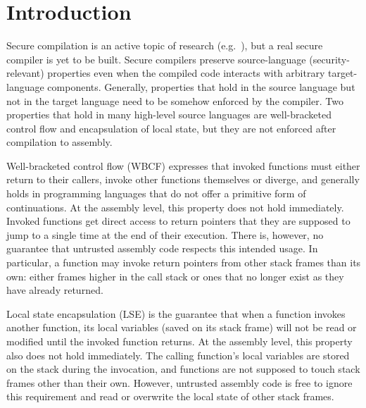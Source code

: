 \documentclass[acmsmall,screen]{acmart}\settopmatter{}
\begin{document}




\maketitle


\section{Introduction}
\label{sec:introduction}
Secure compilation is an active topic of research (e.g.~\citep{devriese_modular_2017,patrignani_hyper_2017,Abate:2018:GCG:3243734.3243745,new_universal_embedding_2016,juglaret_beyond_2016}), but a real secure compiler is yet to be built.
Secure compilers preserve source-language (security-relevant) properties even when the compiled code interacts with arbitrary target-language components.
Generally, properties that hold in the source language but not in the target language need to be somehow enforced by the compiler.
Two properties that hold in many high-level source languages are well-bracketed control flow and encapsulation of local state, but they are not enforced after compilation to assembly.

Well-bracketed control flow (WBCF) expresses that invoked functions must either return to their callers, invoke other functions themselves or diverge, and generally holds in programming languages that do not offer a primitive form of continuations. 
At the assembly level, this property does not hold immediately. 
Invoked functions get direct access to return pointers that they are supposed to jump to a single time at the end of their execution.
There is, however, no guarantee that untrusted assembly code respects this intended usage.
In particular, a function may invoke return pointers from other stack frames than its own: either frames higher in the call stack or ones that no longer exist as they have already returned. 

Local state encapsulation (LSE) is the guarantee that when a function invokes another function, its local variables (saved on its stack frame) will not be read or modified until the invoked function returns.
At the assembly level, this property also does not hold immediately.
The calling function's local variables are stored on the stack during the invocation, and functions are not supposed to touch stack frames other than their own.
However, untrusted assembly code is free to ignore this requirement and read or overwrite the local state of other stack frames.
\end{document}
